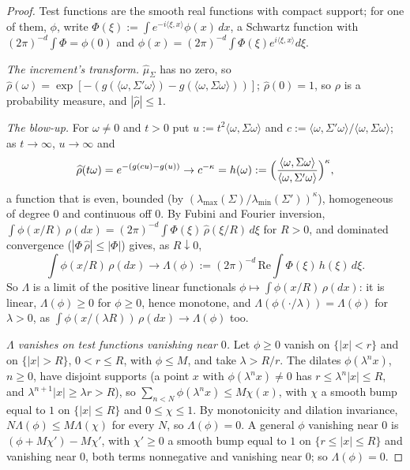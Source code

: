 \begin{proof}
\leanok
Test functions are the smooth real functions with compact support; for one of them, $\phi$,
write $\Phi(\xi) := \int e^{-i\langle\xi,x\rangle}\phi(x)\,dx$, a Schwartz function with
$(2\pi)^{-d}\int\Phi = \phi(0)$ and $\phi(x) = (2\pi)^{-d}\int\Phi(\xi)e^{i\langle\xi,x\rangle}d\xi$.

\emph{The increment's transform.} $\widehat\mu_\Sigma$ has no zero, so
$\widehat\rho(\omega) = \exp[-(g(\langle\omega,\Sigma'\omega\rangle) - g(\langle\omega,\Sigma\omega\rangle))]$;
$\widehat\rho(0) = 1$, so $\rho$ is a probability measure, and $|\widehat\rho| \le 1$.

\emph{The blow-up.} For $\omega \ne 0$ and $t > 0$ put $u := t^2\langle\omega,\Sigma\omega\rangle$ and
$c := \langle\omega,\Sigma'\omega\rangle/\langle\omega,\Sigma\omega\rangle$; as $t \to \infty$, $u \to \infty$ and
\[
  \widehat\rho(t\omega) = e^{-(g(cu) - g(u))} \to c^{-\kappa}
  = h(\omega) := \Bigl(\frac{\langle\omega,\Sigma\omega\rangle}{\langle\omega,\Sigma'\omega\rangle}\Bigr)^{\kappa} ,
\]
a function that is even, bounded (by $(\lambda_{\max}(\Sigma)/\lambda_{\min}(\Sigma'))^\kappa$), homogeneous
of degree $0$ and continuous off $0$. By Fubini and Fourier inversion,
$\int\phi(x/R)\,\rho(dx) = (2\pi)^{-d}\int\Phi(\xi)\,\widehat\rho(\xi/R)\,d\xi$ for $R > 0$, and dominated
convergence ($|\Phi\,\widehat\rho| \le |\Phi|$) gives, as $R \downarrow 0$,
\[
  \int\phi(x/R)\,\rho(dx) \to \Lambda(\phi) := (2\pi)^{-d}\,\mathrm{Re}\int\Phi(\xi)\,h(\xi)\,d\xi .
\]
So $\Lambda$ is a limit of the positive linear functionals
$\phi \mapsto \int\phi(x/R)\,\rho(dx)$: it is linear, $\Lambda(\phi) \ge 0$ for $\phi \ge 0$, hence
monotone, and $\Lambda(\phi(\cdot/\lambda)) = \Lambda(\phi)$ for $\lambda > 0$, as
$\int\phi(x/(\lambda R))\,\rho(dx) \to \Lambda(\phi)$ too.

\emph{$\Lambda$ vanishes on test functions vanishing near $0$.} Let $\phi \ge 0$ vanish on
$\{|x| < r\}$ and on $\{|x| > R\}$, $0 < r \le R$, with $\phi \le M$, and take
$\lambda > R/r$. The dilates $\phi(\lambda^nx)$, $n \ge 0$, have disjoint supports (a point
$x$ with $\phi(\lambda^nx) \ne 0$ has $r \le \lambda^n|x| \le R$, and $\lambda^{n+1}|x| \ge \lambda r > R$),
so $\sum_{n<N}\phi(\lambda^nx) \le M\chi(x)$, with $\chi$ a smooth bump equal to $1$ on
$\{|x| \le R\}$ and $0 \le \chi \le 1$. By monotonicity and dilation invariance,
$N\Lambda(\phi) \le M\Lambda(\chi)$ for every $N$, so $\Lambda(\phi) = 0$. A general $\phi$ vanishing
near $0$ is $(\phi + M\chi') - M\chi'$, with $\chi' \ge 0$ a smooth bump equal to $1$ on
$\{r \le |x| \le R\}$ and vanishing near $0$, both terms nonnegative and vanishing near $0$; so
$\Lambda(\phi) = 0$.


\end{proof}
